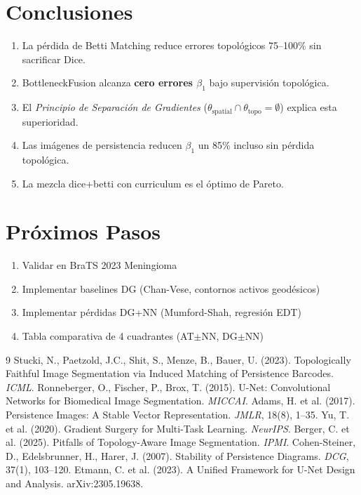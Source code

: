 \documentclass[10pt,twocolumn]{article}
\begin{document}
\section{Conclusiones}

\begin{enumerate}[noitemsep]
\item La pérdida de Betti Matching reduce errores topológicos 75--100\% sin sacrificar Dice.
\item BottleneckFusion alcanza \textbf{cero errores $\beta_1$} bajo supervisión topológica.
\item El \emph{Principio de Separación de Gradientes} ($\theta_{\text{spatial}} \cap \theta_{\text{topo}} = \emptyset$) explica esta superioridad.
\item Las imágenes de persistencia reducen $\beta_1$ un 85\% incluso sin pérdida topológica.
\item La mezcla dice+betti con curriculum es el óptimo de Pareto.
\end{enumerate}

\section{Próximos Pasos}

\begin{enumerate}[noitemsep]
\item Validar en BraTS 2023 Meningioma
\item Implementar baselines DG (Chan-Vese, contornos activos geodésicos)
\item Implementar pérdidas DG+NN (Mumford-Shah, regresión EDT)
\item Tabla comparativa de 4 cuadrantes (AT$\pm$NN, DG$\pm$NN)
\end{enumerate}

\begin{thebibliography}{9}
 Stucki, N., Paetzold, J.C., Shit, S., Menze, B., Bauer, U. (2023). Topologically Faithful Image Segmentation via Induced Matching of Persistence Barcodes. \emph{ICML}.
 Ronneberger, O., Fischer, P., Brox, T. (2015). U-Net: Convolutional Networks for Biomedical Image Segmentation. \emph{MICCAI}.
 Adams, H. et al. (2017). Persistence Images: A Stable Vector Representation. \emph{JMLR}, 18(8), 1--35.
 Yu, T. et al. (2020). Gradient Surgery for Multi-Task Learning. \emph{NeurIPS}.
 Berger, C. et al. (2025). Pitfalls of Topology-Aware Image Segmentation. \emph{IPMI}.
 Cohen-Steiner, D., Edelsbrunner, H., Harer, J. (2007). Stability of Persistence Diagrams. \emph{DCG}, 37(1), 103--120.
 Etmann, C. et al. (2023). A Unified Framework for U-Net Design and Analysis. arXiv:2305.19638.
\end{thebibliography}
\end{document}
